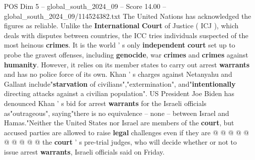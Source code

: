 \begin{textsample}{POS Dim 5 – global\_south\_2024\_09 – Score 14.00 – global\_south\_2024\_09/114524382.txt}
The United Nations has acknowledged the figures as reliable.
Unlike the \textbf{International} \textbf{Court} of Justice ( ICJ ), which deals with disputes between countries, the ICC tries individuals suspected of the most heinous \textbf{crimes}.
It is the world ' s only \textbf{independent} \textbf{court} set up to probe the gravest offenses, including \textbf{genocide}, war \textbf{crimes} and \textbf{crimes} against \textbf{humanity}.
However, it relies on its member states to carry out arrest \textbf{warrants} and has no police force of its own.
Khan ' s charges against Netanyahu and Gallant include"\textbf{starvation} of civilians","extermination", and"\textbf{intentionally} directing attacks against a civilian population".
US President Joe Biden has denounced Khan ' s bid for arrest \textbf{warrants} for the Israeli officials as"outrageous", saying"there is no equivalence -- none -- between Israel and Hamas."Neither the United States nor Israel are members of the \textbf{court}, but accused parties are allowed to raise \textbf{legal} challenges even if they are @ @ @ @ @ @ @ @ @ @ the \textbf{court} ' s pre-trial judges, who will decide whether or not to issue arrest \textbf{warrants}, Israeli officials said on Friday.

\end{textsample}

